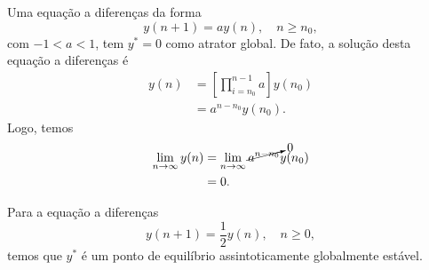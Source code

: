 Uma equação a diferenças da forma
  \begin{equation}
    y(n+1) = ay(n),\quad n\geq n_0,
  \end{equation}
  com $-1<a<1$, tem $y^*=0$ como atrator global. De fato, a solução desta equação a diferenças é
  \begin{align}
    y(n) &= \left[\prod_{i=n_0}^{n-1}a\right]y(n_0) \\
         &= a^{n-n_0}y(n_0).
  \end{align}
  Logo, temos
  \begin{align}
    \lim_{n\to\infty} y(n) &= \lim_{n\to\infty} \cancelto{0}{a^{n-n_0}}y(n_0)\\
                           &= 0.
  \end{align}

\begin{ex}
  Para a equação a diferenças
  \begin{equation}
    y(n+1) = \frac{1}{2}y(n),\quad n\geq 0,
  \end{equation}
  temos que $y^*$ é um ponto de equilíbrio assintoticamente globalmente estável.
\end{ex}

